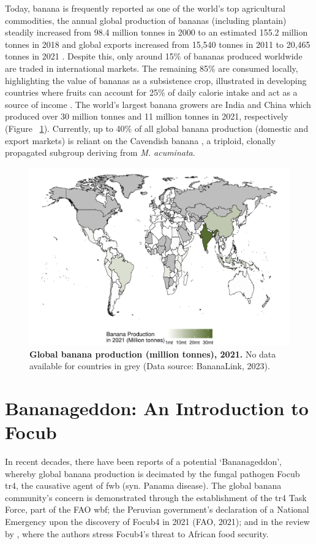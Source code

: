 Today, banana is frequently reported as one of the world’s top agricultural commodities, the annual global production of bananas (including plantain) steadily increased from 98.4 million tonnes in 2000 to an estimated 155.2 million tonnes in 2018  and global exports increased from 15,540 tonnes in 2011 to 20,465 tonnes in 2021 \parencite{FAO2022}. Despite this, only around 15\% of bananas produced worldwide are traded in international markets. The remaining 85\% are consumed locally, highlighting the value of bananas as a subsistence crop, illustrated in developing countries where fruits can account for 25\% of daily calorie intake and act as a source of income \parencite{FAO2019}. The world’s largest banana growers are India and China which produced over 30 million tonnes and 11 million tonnes in 2021, respectively \parencite{BananaLink2023} (Figure ~\ref{fig:bananaProdMap}).  Currently, up to 40\% of all global banana production (domestic and export markets) is reliant on the Cavendish banana \parencite{Warman2018}, a triploid, clonally propagated subgroup deriving from \textit{M. acuminata}.

\begin{figure}[h!]
    \centering
    \includegraphics[width=\textwidth]{Figures/BananaProdMap.pdf}
    \caption[Global banana production, 2021]{\textbf{Global banana production (million tonnes), 2021.} No data available for countries in grey (Data source: BananaLink, 2023).}
    \label{fig:bananaProdMap}
\end{figure}

\section{Bananageddon: An Introduction to \acl{Focub}}
In recent decades, there have been reports of a potential ‘Bananageddon’, whereby global banana production is decimated by the fungal pathogen \acf{Focub} \acf{tr4}, the causative agent of \ac{fwb} (syn. Panama disease). The global banana community’s concern is demonstrated through the establishment of the \acs{tr4} Task Force, part of the \ac{FAO} \ac{wbf}; the Peruvian government’s declaration of a National Emergency upon the discovery of \ac{Focub4} in 2021 (FAO, 2021); and in the review by \textcite{Westerhoven2022}, where the authors stress \ac{Focub4}'s threat to African food security.   

